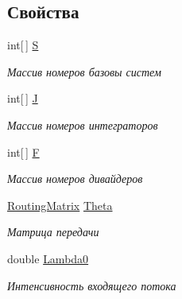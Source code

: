 \subsection*{Свойства}
\begin{DoxyCompactItemize}
\item 
int\mbox{[}$\,$\mbox{]} \hyperlink{class_network_descriptions_1_1_description_o_f_j_q_n_a31744a17bac05c3e10a7e958ad3fdb0c}{S}
\begin{DoxyCompactList}\small\item\em Массив номеров базовы систем \end{DoxyCompactList}\item 
int\mbox{[}$\,$\mbox{]} \hyperlink{class_network_descriptions_1_1_description_o_f_j_q_n_a75cf16b40e07c708c6580d331e692de0}{J}
\begin{DoxyCompactList}\small\item\em Массив номеров интеграторов \end{DoxyCompactList}\item 
int\mbox{[}$\,$\mbox{]} \hyperlink{class_network_descriptions_1_1_description_o_f_j_q_n_aaadbe1cc3f0bdb0bef593d2b732c988f}{F}
\begin{DoxyCompactList}\small\item\em Массив номеров дивайдеров \end{DoxyCompactList}\item 
\hyperlink{class_network_descriptions_1_1_routing_matrix}{Routing\+Matrix} \hyperlink{class_network_descriptions_1_1_description_o_f_j_q_n_af8d4bf8f19a4db2daef14d0dafd77a00}{Theta}
\begin{DoxyCompactList}\small\item\em Матрица передачи \end{DoxyCompactList}\item 
double \hyperlink{class_network_descriptions_1_1_description_o_f_j_q_n_a0670c1d5fa5d487f7bddb667d421a85c}{Lambda0}
\begin{DoxyCompactList}\small\item\em Интенсивность входящего потока \end{DoxyCompactList}\item 

\end{DoxyCompactItemize}
